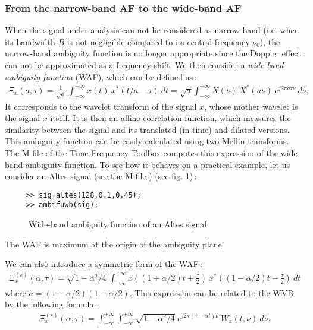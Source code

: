 \subsubsection{From the narrow-band AF to the wide-band AF}
 When the signal under analysis can not
  be considered as narrow-band (i.e. when its bandwidth $B$ is not
  negligible compared to its central frequency $\nu_0$), the narrow-band
  ambiguity function is no longer appropriate since the Doppler effect can
  not be approximated as a frequency-shift. We then consider a {\it
  wide-band ambiguity function} (WAF), which can be defined as\,:
\begin{eqnarray*}
\Xi_x(a,\tau) = \frac{1}{\sqrt{a}}\ \int_{-\infty}^{+\infty} x(t)\
x^*(t/a-\tau)\ dt = \sqrt{a} \int_{-\infty}^{+\infty} X(\nu)\ X^*(a\nu)\
e^{j2\pi a \tau\nu}\ d\nu. 
\end{eqnarray*}
It corresponds to the wavelet transform of the signal $x$, whose mother
wavelet is the signal $x$ itself. It is then an affine correlation
function, which measures the similarity between the signal and its
translated (in time) and dilated versions. This ambiguity function can be
easily calculated using two Mellin transforms. The M-file \index{\ttfamily
ambifuwb}{\ttfamily ambifuwb.m} of the Time-Frequency Toolbox computes this
expression of the wide-band ambiguity function. To see how it behaves on a
practical example, let us consider an Altes signal (see the M-file
\index{\ttfamily altes}{\ttfamily altes.m}) (see fig. \ref{En2fig8})\,:
\begin{verbatim}
     >> sig=altes(128,0.1,0.45);
     >> ambifuwb(sig);
\end{verbatim}
\begin{figure}[htb]
\epsfxsize=10cm
\epsfysize=8cm
\centerline{}
\caption{\label{En2fig8}Wide-band ambiguity function of an Altes signal}
\end{figure}
The WAF is maximum at the origin of the ambiguity plane.  

We can also introduce a symmetric form of the WAF\,:
\begin{eqnarray*}
\Xi_x^{(s)}(\alpha,\tau) = \sqrt{1-\alpha^2/4}\ 
 \int_{-\infty}^{+\infty} x\left((1+\alpha/2)t+\frac{\tau}{2}\right)\
x^*\left((1-\alpha/2)t-\frac{\tau}{2}\right)\ dt       
\end{eqnarray*}
where $a=(1+\alpha/2)(1-\alpha/2)$. This expression can be related to the WVD
by the following formula\,:
\begin{eqnarray*}
\Xi_x^{(s)}(\alpha,\tau) = \int_{-\infty}^{+\infty}\int_{-\infty}^{+\infty}
\sqrt{1-\alpha^2/4}\ e^{j2\pi(\tau+\alpha t)\nu}\ W_x(t,\nu)\ d\nu.
\end{eqnarray*}


